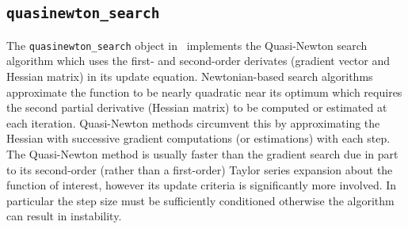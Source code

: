 \subsection{{\tt quasinewton\_search} }
\label{module:optim:quasinewton_search}
The {\tt quasinewton\_search} object in \liquid\ implements the
Quasi-Newton search algorithm which uses the first- and second-order
derivates (gradient vector and Hessian matrix) in its update equation.
Newtonian-based search algorithms approximate the function to be nearly
quadratic near its optimum which requires the second partial derivative
(Hessian matrix) to be computed or estimated at each iteration.
Quasi-Newton methods circumvent this by approximating the Hessian with
successive gradient computations (or estimations) with each step.
The Quasi-Newton method is usually faster than the gradient search due
in part to its second-order (rather than a first-order) Taylor series
expansion about the function of interest,
however its update criteria is significantly more involved.
In particular the step size %
must be sufficiently conditioned
otherwise the algorithm can result in instability.


%
%

